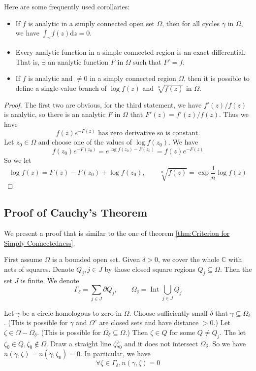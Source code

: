 \documentclass[../main.tex]{subfiles}
\begin{document}
Here are some frequently used corollaries:
\begin{itemize}
	\item If $f$ is analytic in a simply connected open set $\Omega$, then for all cycles $\gamma$ in $\Omega$, we have $\int_{\gamma} f(z) \mathrm{d} z = 0$.
	\item Every analytic function in a simple connected region is an exact differential. That is, $\exists $ an analytic function $F$ in $\Omega$ such that $F' = f$.
	\item If $f$ is analytic and $\neq 0$ in a simply connected region $\Omega$, then it is possible to define a single-value branch of $\log f(z)$ and $\sqrt[n]{f(z)}$ in $\Omega$.
\end{itemize}
\begin{proof}
The first two are obvious, for the third statement, we have $f'(z) / f(z)$ is analytic, so there is an analytic $F$ in $\Omega$ that $F'(z) = f'(z) / f(z)$. Thus we have
\begin{equation*}
f(z) e^{-F(z)} \text{ has zero derivative so is constant.}
\end{equation*}
Let $z_0\in \Omega$ and choose one of the values of $\log f(z_0)$. We have
\begin{equation*}
f(z_0)e^{-F(z_0)} = e^{\log f(z_0)-F(z_0)} = f(z) e^{-F(z)}
\end{equation*}
So we let
\begin{equation*}
\log f(z) = F(z)-F(z_0) + \log f(z_0), \qquad \sqrt[n]{f(z)} = \exp {\frac{1}{n}\log f(z)}
\end{equation*}
\end{proof}

\subsection{Proof of Cauchy's Theorem}
We present a proof that is similar to the one of theorem \ref{thm:Criterion for Simply Connectedness}.

First assume $\Omega$ is a bounded open set. Given $\delta>0$, we cover the whole $\mathbb{C}$ with nets of squares. Denote $Q_j,j\in J$ by those closed square regions $Q_j \subseteq \Omega$. Then the set $J$ is finite. We denote
\begin{equation}
	\Gamma_{\delta} = \sum_{j\in J} \partial Q_j ,\qquad  \Omega_{\delta} = \operatorname{Int} \bigcup_{j\in J} Q_j
\end{equation}

Let $\gamma$ be a circle homologous to zero in $\Omega$. Choose sufficiently small $\delta$ that $\gamma \subseteq \Omega_{\delta}$. (This is possible for $\gamma$ and $\Omega^c$ are closed sets and have distance $>0$.) Let $\zeta\in \Omega-\Omega_{\delta}$. (This is possible for $\overline{\Omega_{\delta}}\subseteq \Omega$.) Then $\zeta\in Q$ for some $Q\neq Q_j$. The let $\zeta_0\in Q, \zeta_0\notin \Omega$. Draw a straight line $\overline{\zeta \zeta_0}$ and it does not intersect $\Omega_{\delta}$. So we have $n(\gamma,\zeta) = n(\gamma,\zeta_0) = 0$. In particular, we have
\begin{equation*}
\forall \zeta\in \Gamma_{\delta}, n(\gamma,\zeta)=0
\end{equation*}
\end{document}
